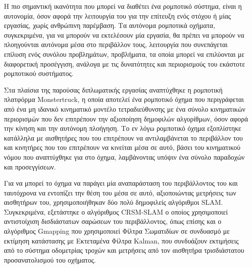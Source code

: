\documentclass[
11pt, %
twoside, %
english,
headsepline, %
]{MastersDoctoralThesis} %
\begin{document}

\begin{summary}
Η πιο σημαντική ικανότητα που μπορεί να διαθέτει ένα ρομποτικό σύστημα, είναι η αυτονομία, όσον αφορά την λειτουργία του για την επίτευξη ενός στόχου ή μίας εργασίας, χωρίς ανθρώπινη παρέμβαση. Τα αυτόνομα ρομποτικά οχήματα, συγκεκριμένα, για να μπορούν να εκτελέσουν μία εργασία, θα πρέπει να μπορούν να πλοηγούνται αυτόνομα μέσα στο περιβάλλον τους, λειτουργία που συνεπάγεται επίλυση ενός συνόλου προβλημάτων, προβλήματα, τα οποία μπορεί να επιλύονται με διαφορετική προσέγγιση, ανάλογα με τις δυνατότητες και περιορισμούς του εκάστοτε ρομποτικού συστήματος.

\bigskip
Στα πλαίσια της παρούσας διπλωματικής εργασίας αναπτύχθηκε η ρομποτική πλατφόρμα Monstertruck, η οποία αποτελεί ένα ρομποτικό όχημα που περιγράφεται από ένα μη ιδανικό κινηματικό μοντέλο τετραδιεύθυνσης με ένα σύνολο κινηματικών περιορισμών που δεν επιτρέπουν την αξιοποίηση δημοφιλών αλγορίθμων, όσον αφορά την κίνηση και την αυτόνομη πλοήγηση. Το εν λόγω ρομποτικό όχημα εξοπλίστηκε κατάλληλα με αισθητήρες που του επιτρέπουν να αντιλαμβάνεται το περιβάλλον του και κινητήρες που του επιτρέπουν να κινείται μέσα σε αυτό, βάσει του κινηματικού νόμου που αναπτύχθηκε για στο όχημα, λαμβάνοντας υπόψιν ένα σύνολο παραδοχών και προσεγγίσεων.

\bigskip
Για να μπορεί το όχημα να παράγει μία αναπαράσταση του περιβάλλοντος του και ταυτόχρονα να εντοπίζει την θέση του μέσα σε αυτό, αξιοποιώντας μετρήσεις των αισθητήρων του, χρησιμοποιήθηκαν δύο πολύ δημοφιλείς αλγόριθμοι SLAM. Συγκεκριμένα, εξετάστηκε ο αλγόριθμος CRSM-SLAM ο οποίος χρησιμοποιεί αντιστοίχιση δισδιάστατων σαρώσεων του περιβάλλοντος, όπως επίσης και ο αλγόριθμος Gmapping που χρησιμοποιεί Φίλτρα Σωματιδίων σε συνδυασμό με εκτίμηση κατάστασης με Εκτεταμένα Φίλτρα Kalman, που συνδυάζουν εκτιμήσεις από το σύστημα οδομετρίας τροχών και μετρήσεις από τον αισθητήρα τρισδιάστατου προσανατολισμού του οχήματος.


\end{summary}
\end{document}
